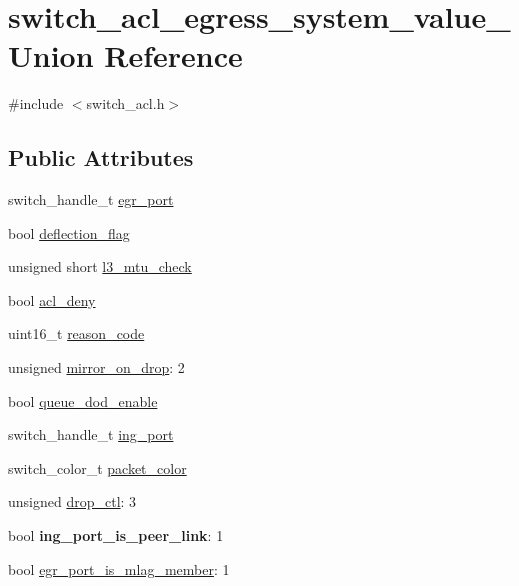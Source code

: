 \hypertarget{unionswitch__acl__egress__system__value__}{\section{switch\+\_\+acl\+\_\+egress\+\_\+system\+\_\+value\+\_\+ Union Reference}
\label{unionswitch__acl__egress__system__value__}
}


{\ttfamily \#include $<$switch\+\_\+acl.\+h$>$}

\subsection*{Public Attributes}
\begin{DoxyCompactItemize}
\item 
switch\+\_\+handle\+\_\+t \hyperlink{unionswitch__acl__egress__system__value___a4067534613d85c0564aca81512572282}{egr\+\_\+port}
\item 
bool \hyperlink{unionswitch__acl__egress__system__value___ae767ded6ca7e3792830062fe82ce0c0c}{deflection\+\_\+flag}
\item 
unsigned short \hyperlink{unionswitch__acl__egress__system__value___aceafec530cbede98c77286c8181d9337}{l3\+\_\+mtu\+\_\+check}
\item 
bool \hyperlink{unionswitch__acl__egress__system__value___a0dc0fadd3d25bed24df88b5104473850}{acl\+\_\+deny}
\item 
uint16\+\_\+t \hyperlink{unionswitch__acl__egress__system__value___ab415ce1fcc2667a77d533688f0a78368}{reason\+\_\+code}
\item 
unsigned \hyperlink{unionswitch__acl__egress__system__value___a4463209fe0f7a08ff4c5fdbff1d95861}{mirror\+\_\+on\+\_\+drop}\+: 2
\item 
bool \hyperlink{unionswitch__acl__egress__system__value___a27c7f2109af67ac3f4f7f565c88b5db9}{queue\+\_\+dod\+\_\+enable}
\item 
switch\+\_\+handle\+\_\+t \hyperlink{unionswitch__acl__egress__system__value___a0525ae3df304d28d222f7ef991aa5b4c}{ing\+\_\+port}
\item 
switch\+\_\+color\+\_\+t \hyperlink{unionswitch__acl__egress__system__value___af0ec67d45d2cff1f6fd1912b5adca2bc}{packet\+\_\+color}
\item 
unsigned \hyperlink{unionswitch__acl__egress__system__value___adab6d2bf1ddc723d450c8d63ffc6c395}{drop\+\_\+ctl}\+: 3
\item 
\hypertarget{unionswitch__acl__egress__system__value___a1692a2395dd5c184cfbc103cec25f151}{bool {\bfseries ing\+\_\+port\+\_\+is\+\_\+peer\+\_\+link}\+: 1}\label{unionswitch__acl__egress__system__value___a1692a2395dd5c184cfbc103cec25f151}

\item 
bool \hyperlink{unionswitch__acl__egress__system__value___a54a5ab7dfff12621d6138267a46e300a}{egr\+\_\+port\+\_\+is\+\_\+mlag\+\_\+member}\+: 1
\end{DoxyCompactItemize}


